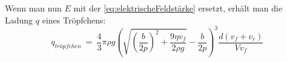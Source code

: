 \noindent Wenn man nun $E$ mit der \autoref{eq:elektrischeFeldstärke} ersetzt, erhält man die Ladung $q$ eines Tröpfchens:
\begin{equation*}
	q_{tröpfchen} \ = \ \frac{4}{3} \pi \rho g \left( \sqrt{\left( \frac{b}{2p}\right)^2 + \frac{9\eta v_f}{2\rho g}} - \frac{b}{2p} \right)^3 \frac{d(v_f + v_r)}{Vv_f}
\end{equation*}







